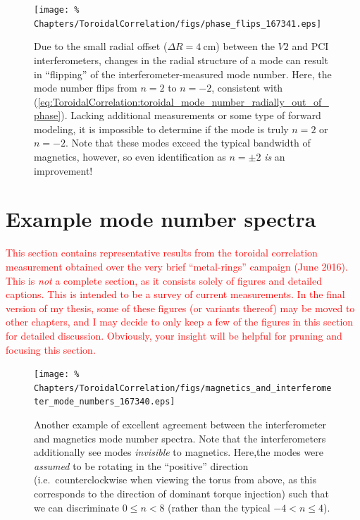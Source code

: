 \begin{figure}
  \centering
  \texttt{[image: \%
    Chapters/ToroidalCorrelation/figs/phase\_flips\_167341.eps]}
  \caption[Mode-number ``flipping'' due to the small radial offset
      between the $V2$ and PCI interferometers]{%
    Due to the small radial offset ($\Delta R = \SI{4}{\centi\meter}$)
    between the $V2$ and PCI interferometers,
    changes in the radial structure of a mode
    can result in ``flipping'' of the interferometer-measured mode number.
    Here, the mode number flips from $n = 2$ to $n = -2$,
    consistent with
    (\ref{eq:ToroidalCorrelation:toroidal_mode_number_radially_out_of_phase}).
    Lacking additional measurements or some type of forward modeling,
    it is impossible to determine if the mode is truly $n = 2$ or $n = -2$.
    Note that these modes exceed the typical bandwidth of magnetics, however,
    so even identification as $n = \pm 2$ \emph{is} an improvement!}
\label{fig:ToroidalCorrelation:mode_number_flips}
\end{figure}


\section{Example mode number spectra}
\label{sec:ToroidalCorrelation:survey_of_spectra}
\textcolor{red}{%
  This section contains representative results
  from the toroidal correlation measurement
  obtained over the very brief ``metal-rings'' campaign (June 2016).
  This is \emph{not} a complete section,
  as it consists solely of figures and detailed captions.
  This is intended to be a survey of current measurements.
  In the final version of my thesis,
  some of these figures (or variants thereof)
  may be moved to other chapters, and
  I may decide to only keep a few of the figures
  in this section for detailed discussion.
  Obviously, your insight will be helpful
  for pruning and focusing this section.
}

\begin{figure}[h!]
  \centering
  \texttt{[image: \%
    Chapters/ToroidalCorrelation/figs/magnetics\_and\_interferometer\_mode\_numbers\_167340.eps]}
  \caption[Another example of excellent agreement between the
      interferometer and magnetics mode number spectra]{%
    Another example of excellent agreement between the
    interferometer and magnetics mode number spectra. Note that
    the interferometers additionally see modes \emph{invisible} to magnetics.
    Here,the modes were \emph{assumed} to be rotating
    in the ``positive'' direction
    (i.e.\ counterclockwise when viewing the torus from above,
    as this corresponds to the direction of dominant torque injection)
    such that we can discriminate $0 \leq n < 8$
    (rather than the typical $-4 < n \leq 4$).}
\label{fig:ToroidalCorrelation:magnetics_corroboration_2}
\end{figure}

